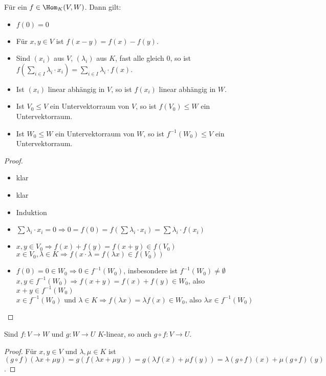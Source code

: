 \begin{proposition}
	Für ein $f\in \Hom_K(V,W)$. Dann gilt:
	\begin{itemize}
		\item $f(0)=0$
		\item Für $x,y\in V$ ist $f(x-y)=f(x)-f(y)$.
		\item Sind $(x_i)$ aus $V$, $(\lambda_i)$ aus $K$, fast alle gleich 0, so ist $f(\sum_{i\in I} \lambda_i
		\cdot x_i)=\sum_{i\in I} \lambda_i\cdot f(x)$.
		\item Ist $(x_i)$ linear abhängig in $V$, so ist $f(x_i)$ linear abhängig in $W$.
		\item Ist $V_0\le V$ ein Untervektorraum von $V$, so ist $f(V_0)\le W$ ein Untervektorraum.
		\item Ist $W_0\le W$ ein Untervektorraum von $W$, so ist $f^{-1}(W_0)\le V$ ein Untervektorraum.
	\end{itemize}
\end{proposition}
\begin{proof}
	\begin{itemize}
		\item klar
		\item klar
		\item Induktion
		\item $\sum \lambda_i\cdot x_i=0\Rightarrow 0=f(0)=f(\sum \lambda_i\cdot x_i)=\sum \lambda_i\cdot f(x_i)$
		\item $x,y\in V_0\Rightarrow f(x)+f(y)=f(x+y)\in f(V_0)$ \\ 
		$x\in V_0,\lambda\in K\Rightarrow f(x\cdot \lambda= f(\lambda x)\in f(V_0))$
		\item $f(0)=0\in W_0\Rightarrow 0\in f^{-1}(W_0)$, insbesondere ist $f^{-1}(W_0)\neq \emptyset$ \\ 
		$x,y\in f^{-1}(W_0)\Rightarrow f(x+y)=f(x)+f(y)\in W_0$, also $x+y\in f^{-1}(W_0)$ \\
		$x\in f^{-1}(W_0)$ und $\lambda\in K\Rightarrow f(\lambda x)=\lambda f(x)\in W_0$, also $\lambda x\in f^{-1}(W_0)$
	\end{itemize}
\end{proof}

\begin{proposition}
	Sind $f:V\to W$ und $g:W\to U$ $K$-linear, so auch $g\circ f: V\to U$.
\end{proposition}
\begin{proof}
	Für $x,y\in V$ und $\lambda,\mu\in K$ ist $(g\circ f)(\lambda x + \mu y)=g(f(\lambda x + \mu y))=g(\lambda f(x) + 
	\mu f(y))=\lambda (g\circ f)(x) + \mu (g\circ f)(y)$.
\end{proof}

